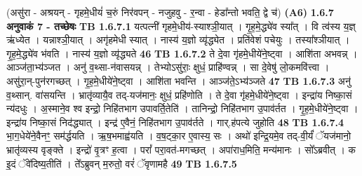 \documentclass[17pt]{extarticle}
\begin{document}
                  \newline
                                    (असु॑रा - अश्रयन् - गृहमे॒धीयं॑ च॒रुं निर॑वपन् - नजुहवु - र॒न्वा - हेडा᳚न्तो भवति॒ द्वे च॑) \textbf{(A6)} \newline \newline
                \textbf{ 1.6.7     अनुवाकं   7 - तच्छेषः} \newline
                                \textbf{ TB 1.6.7.1} \newline
                  यत्पत्नी॑ गृहमे॒धीय॑-स्याश्ञी॒यात् । गृ॒ह॒मे॒द्ध्ये॑व स्या᳚त् । वि त्व॑स्य य॒ज्ञ् ऋ॑ध्येत । यन्नाश्ञी॒यात् । अगृ॑हमेधी स्यात् । नास्य॑ य॒ज्ञो व्यृ॑द्ध्येत । प्रति॑वेशं पचेयुः । तस्या᳚श्ञीयात् । गृ॒ह॒मे॒द्ध्ये॑व भ॑वति । नास्य॑ य॒ज्ञो व्यृ॑द्ध्यते \textbf{ 46} \newline
                  \newline
                                \textbf{ TB 1.6.7.2} \newline
                  ते दे॒वा गृ॑हमे॒धीये॑ने॒ष्ट्वा । आशि॑ता अभवन्न् । आञ्ज॑ता॒भ्य॑ञ्जत । अनु॑ व॒थ्सा-न॑वासयन्न् । तेभ्योऽसु॑राः॒ क्षुधं॒ प्राहि॑ण्वन्न् । सा दे॒वेषु॑ लो॒कमवि॑त्त्वा । असु॑रा॒न्-पुन॑रगच्छत् । गृ॒ह॒मे॒धीये॑ने॒ष्ट्वा । आशि॑ता भवन्ति । आञ्ज॑ते॒ऽभ्य॑ञ्जते \textbf{ 47} \newline
                  \newline
                                \textbf{ TB 1.6.7.3} \newline
                  अनु॑ व॒थ्सान्. वा॑सयन्ति । भ्रातृ॑व्यायै॒व तद्-यज॑मानः॒ क्षुधं॒ प्रहि॑णोति । ते दे॒वा गृ॑हमे॒धीये॑ने॒ष्ट्वा । इन्द्रा॑य निष्का॒सं न्य॑दधुः । अ॒स्माने॒व श्व इन्द्रो॒ निहि॑तभाग उपावर्ति॒तेति॑ । तानिन्द्रो॒ निहि॑तभाग उ॒पाव॑र्तत । गृ॒ह॒मे॒धीये॑ने॒ष्ट्वा । इन्द्रा॑य निष्का॒सं निद॑द्ध्यात् । इन्द्र॑ ए॒वैनं॒ निहि॑तभाग उ॒पाव॑र्तते । गार्.ह॑पत्ये जुहोति \textbf{ 48} \newline
                  \newline
                                \textbf{ TB 1.6.7.4} \newline
                  भा॒ग॒धेये॑ने॒वैनꣳ॒॒ सम॑र्द्धयति । ऋ॒ष॒भमाह्व॑यति । व॒ष॒ट्का॒र ए॒वास्य॒ सः । अथो॑ इन्द्रि॒यमे॒व तद्-वी॒र्यं॑ ॅयज॑मानो॒ भ्रातृ॑व्यस्य वृङ्क्ते । इन्द्रो॑ वृ॒त्रꣳ ह॒त्वा । परां᳚ परा॒वत॑-मगच्छत् । अपा॑राध॒मिति॒ मन्य॑मानः । सो᳚ऽब्रवीत् । क इ॒दं ॅवे॑दिष्य॒तीति॑ । ते᳚ऽब्रुवन् म॒रुतो॒ वरं॑ ॅवृणामहै \textbf{ 49} \newline
                  \newline
                                \textbf{ TB 1.6.7.5} \newline
\end{document}
